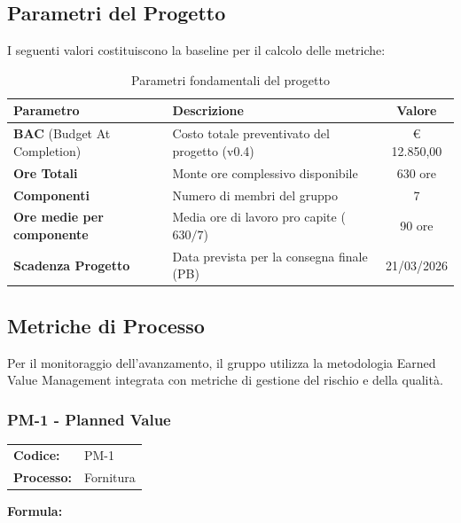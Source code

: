 \documentclass[a4paper,11pt,oneside]{scrartcl}
\begin{document}
\subsection{Parametri del Progetto}
I seguenti valori costituiscono la baseline{\scriptsize{}} per il calcolo delle metriche:

\begin{table}[h!]
\centering
\renewcommand{\arraystretch}{1.3}
\begin{tabularx}{\textwidth}{lXc}
\toprule
\textbf{Parametro} & \textbf{Descrizione} & \textbf{Valore} \\
\midrule
\textbf{BAC} (Budget At Completion) & Costo totale preventivato del progetto (v0.4) & € 12.850,00 \\
\textbf{Ore Totali} & Monte ore complessivo disponibile & 630 ore \\
\textbf{Componenti} & Numero di membri del gruppo & 7 \\
\textbf{Ore medie per componente} & Media ore di lavoro pro capite ($630/7$) & 90 ore \\
\textbf{Scadenza Progetto} & Data prevista per la consegna finale (PB{\scriptsize\raisebox{-0.5ex}{G}}) & 21/03/2026 \\
\bottomrule
\end{tabularx}
\caption{Parametri fondamentali del progetto}
\end{table}


\subsection{Metriche di Processo}
Per il monitoraggio dell'avanzamento, il gruppo utilizza la metodologia Earned Value Management{\scriptsize{}} integrata con metriche di gestione del rischio e della qualità.

\subsubsection{PM-1 - Planned Value}

\noindent
\begin{tabular}{@{}p{}p{}@{}}
\textbf{Codice:} & PM-1 \\
\textbf{Processo:} & Fornitura \\
\end{tabular}

\vspace{0.3cm}
\noindent\textbf{Formula:}
\end{document}
